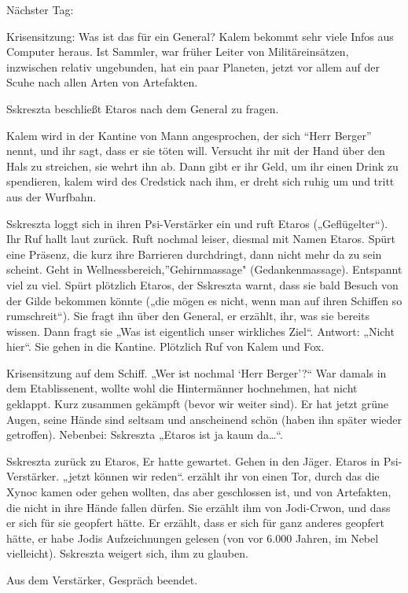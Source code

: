 \documentclass[11pt]{article}
\begin{document}
Nächster Tag:

Krisensitzung: Was ist das für ein General? Kalem bekommt sehr viele
Infos aus Computer heraus. Ist Sammler, war früher Leiter von
Militäreinsätzen, inzwischen relativ ungebunden, hat ein paar Planeten,
jetzt vor allem auf der Scuhe nach allen Arten von Artefakten.

Sskreszta beschließt Etaros nach dem General zu fragen.

Kalem wird in der Kantine von Mann angesprochen, der sich ``Herr
Berger'' nennt, und ihr sagt, dass er sie töten will. Versucht ihr mit
der Hand über den Hals zu streichen, sie wehrt ihn ab. Dann gibt er ihr
Geld, um ihr einen Drink zu spendieren, kalem wird des Credstick nach
ihm, er dreht sich ruhig um und tritt aus der Wurfbahn.

Sskreszta loggt sich in ihren Psi-Verstärker ein und ruft Etaros
(„Geflügelter``). Ihr Ruf hallt laut zurück. Ruft nochmal leiser,
diesmal mit Namen Etaros. Spürt eine Präsenz, die kurz ihre Barrieren
durchdringt, dann nicht mehr da zu sein scheint. Geht in
Wellnessbereich,''Gehirnmassage" (Gedankenmassage). Entspannt viel zu
viel. Spürt plötzlich Etaros, der Sskreszta warnt, dass sie bald Besuch
von der Gilde bekommen könnte („die mögen es nicht, wenn man auf ihren
Schiffen so rumschreit``). Sie fragt ihn über den General, er erzählt,
ihr, was sie bereits wissen. Dann fragt sie „Was ist eigentlich unser
wirkliches Ziel``. Antwort: „Nicht hier``. Sie gehen in die Kantine.
Plötzlich Ruf von Kalem und Fox.

Krisensitzung auf dem Schiff. „Wer ist nochmal `Herr Berger'?`` War
damals in dem Etablissenent, wollte wohl die Hintermänner hochnehmen,
hat nicht geklappt. Kurz zusammen gekämpft (bevor wir weiter sind). Er
hat jetzt grüne Augen, seine Hände sind seltsam und anscheinend schön
(haben ihn später wieder getroffen). Nebenbei: Sskreszta „Etaros ist ja
kaum da\ldots{}``.

Sskreszta zurück zu Etaros, Er hatte gewartet. Gehen in den Jäger.
Etaros in Psi-Verstärker. „jetzt können wir reden``. erzählt ihr von
einen Tor, durch das die Xynoc kamen oder gehen wollten, das aber
geschlossen ist, und von Artefakten, die nicht in ihre Hände fallen
dürfen. Sie erzählt ihm von Jodi-Crwon, und dass er sich für sie
geopfert hätte. Er erzählt, dass er sich für ganz anderes geopfert
hätte, er habe Jodis Aufzeichnungen gelesen (von vor 6.000 Jahren, im
Nebel vielleicht). Sskreszta weigert sich, ihm zu glauben.

Aus dem Verstärker, Gespräch beendet.
\end{document}
